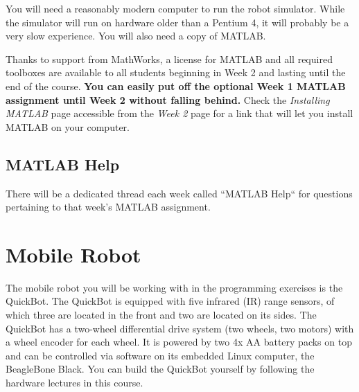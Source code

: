 \documentclass[10pt]{article}
\begin{document}
You will need a reasonably modern computer to run the robot simulator. While the simulator will run on hardware older than a Pentium 4, it will probably be a very slow experience. You will also need a copy of MATLAB. 

Thanks to support from MathWorks, a license for MATLAB and all required toolboxes are available to all students beginning in Week 2 and lasting until the end of the course. \textbf{You can easily put off the optional Week 1 MATLAB assignment until Week 2 without falling behind.} Check the \emph{Installing MATLAB} page accessible from the \emph{Week 2} page for a link that will let you install MATLAB on your computer. 

\subsection{MATLAB Help}
There will be a dedicated thread each week called ``MATLAB Help`` for questions pertaining to that week's MATLAB assignment. 

\newpage
\section{Mobile Robot}

The mobile robot you will be working with in the programming exercises is the QuickBot. The QuickBot is equipped with five infrared (IR) range sensors, of which three are located in the front and two are located on its sides. The QuickBot has a two-wheel differential drive system (two wheels, two motors) with a wheel encoder for each wheel. It is powered by two 4x AA battery packs on top and can be controlled via software on its embedded Linux computer, the BeagleBone Black. You can build the QuickBot yourself by following the hardware lectures in this course.
\end{document}
